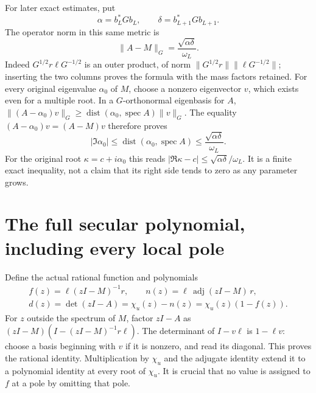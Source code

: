 \documentclass[11pt]{article}
\begin{document}
For later exact estimates, put
\[
\alpha=b_L^*Gb_L,\qquad \delta=b_{L+1}^*Gb_{L+1}.
\]
The operator norm in this same metric is
\begin{equation}\tag{NS9}\label{sfsec:NS9}
\|A-M\|_G=\frac{\sqrt{\alpha\delta}}{\omega_L}.
\end{equation}
Indeed $G^{1/2}r\ell G^{-1/2}$ is an outer product, of norm
$\|G^{1/2}r\|\|\ell G^{-1/2}\|$; inserting the two columns
proves the formula with the mass factors retained.
For every original eigenvalue $\alpha_0$ of $M$, choose a
nonzero eigenvector $v$, which exists even for a multiple root.
In a $G$-orthonormal eigenbasis for $A$,
$\|(A-\alpha_0)v\|_G\geq
\operatorname{dist}(\alpha_0,\operatorname{spec}A)\|v\|_G$.
The equality $(A-\alpha_0)v=(A-M)v$ therefore proves
\begin{equation}\tag{NS10}\label{sfsec:NS10}
|\Im\alpha_0|
\leq\operatorname{dist}(\alpha_0,\operatorname{spec}A)
\leq\frac{\sqrt{\alpha\delta}}{\omega_L}.
\end{equation}
For the original root $\kappa=c+i\alpha_0$ this reads
$|\Re\kappa-c|\leq\sqrt{\alpha\delta}/\omega_L$.
It is a finite exact inequality, not a claim that its right
side tends to zero as any parameter grows.

\section{The full secular polynomial, including every local pole}

Define the actual rational function and polynomials
\begin{equation}\tag{NS11}\label{sfsec:NS11}
\begin{gathered}
f(z)=\ell(zI-M)^{-1}r,\qquad
n(z)=\ell\,\operatorname{adj}(zI-M)\,r,\\
d(z)=\det(zI-A)
=\chi_u(z)-n(z)
=\chi_u(z)(1-f(z)).
\end{gathered}
\end{equation}
For $z$ outside the spectrum of $M$, factor $zI-A$ as
$(zI-M)(I-(zI-M)^{-1}r\ell)$. The determinant of $I-v\ell$
is $1-\ell v$: choose a basis beginning with $v$ if it is
nonzero, and read its diagonal. This proves the rational
identity. Multiplication by $\chi_u$ and the adjugate
identity extend it to a polynomial identity at every root
of $\chi_u$. It is crucial that no value is assigned to
$f$ at a pole by omitting that pole.
\end{document}
